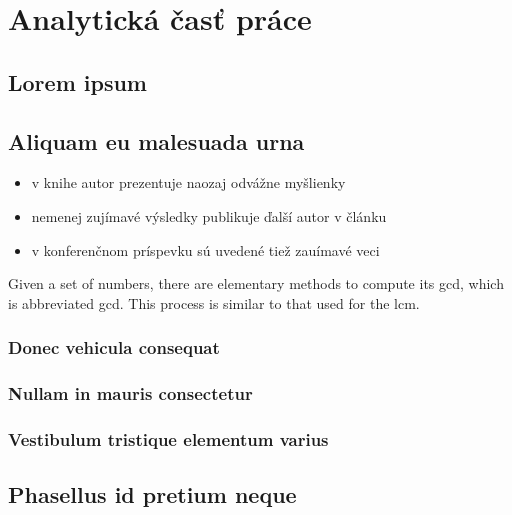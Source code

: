 \chapter{Analytická časť práce}

\section{Lorem ipsum}
\Blindtext
\blinditemize

\section{Aliquam eu malesuada urna}
\blindtext
\begin{itemize}
    \item v knihe \cite{book} autor prezentuje naozaj odvážne myšlienky
    \item nemenej zujímavé výsledky publikuje ďalší autor v článku \cite{article} 
    \item v konferenčnom príspevku \cite{conference} sú uvedené tiež zauímavé veci
\end{itemize}

Given a set of numbers, there are elementary methods to compute its \acrlong{gcd}, which is abbreviated \acrshort{gcd}. This process is similar to that used for the \acrfull{lcm}.

\subsection{Donec vehicula consequat}
\blindtext

\subsection{Nullam in mauris consectetur}
\blindtext
\blindenumerate

\subsection{Vestibulum tristique elementum varius}
\blindtext

\section{Phasellus id pretium neque}
\Blindtext

